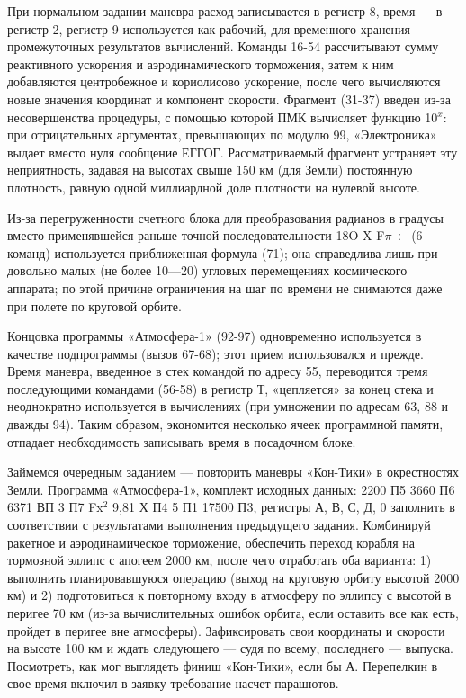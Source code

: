 \documentclass[11pt,a4paper,oneside]{article}
\begin{document}
При нормальном задании маневра расход записывается в регистр 8, время — в регистр 2, регистр 9 используется как рабочий, для временного хранения промежуточных результатов вычислений. Команды 16-54 рассчитывают сумму реактивного ускорения и аэродинамического торможения, затем к ним добавляются центробежное и кориолисово ускорение, после чего вычисляются новые значения координат и компонент скорости. Фрагмент (31-37) введен из-за несовершенства процедуры, с помощью которой ПМК вычисляет функцию 10$^{x}$: при отрицательных аргументах, превышающих по модулю 99, «Электроника» выдает вместо нуля сообщение ЕГГОГ. Рассматриваемый фрагмент устраняет эту неприятность, задавая на высотах свыше 150 км (для Земли) постоянную плотность, равную одной миллиардной доле плотности на нулевой высоте.

Из-за перегруженности счетного блока для преобразования радианов в градусы вместо применявшейся раньше точной последовательности 18O X F$\pi\div$ (6 команд) используется приближенная формула (71); она справедлива лишь при довольно малых (не более 10—20\degree) угловых перемещениях космического аппарата; по этой причине ограничения на шаг по времени не снимаются даже при полете по круговой орбите.

Концовка программы «Атмосфера-1» (92-97) одновременно используется в качестве подпрограммы (вызов 67-68); этот прием использовался и прежде. Время маневра, введенное в стек командой по адресу 55, переводится тремя последующими командами (56-58) в регистр Т, «цепляется» за конец стека и неоднократно используется в вычислениях (при умножении по адресам 63, 88 и дважды 94). Таким образом, экономится несколько ячеек программной памяти, отпадает необходимость записывать время в посадочном блоке.

Займемся очередным заданием — повторить маневры «Кон-Тики» в окрестностях Земли. Программа «Атмосфера-1», комплект исходных данных: 2200 П5 3660 П6 6371 ВП 3 П7 Fx$^{2}$ 9,81 Х П4 5 П1 17500 П3, регистры А, В, С, Д, 0 заполнить в соответствии с результатами выполнения предыдущего задания. Комбинируй ракетное и аэродинамическое торможение, обеспечить переход корабля на тормозной эллипс с апогеем 2000 км, после чего отработать оба варианта: 1) выполнить планировавшуюся операцию (выход на круговую орбиту высотой 2000 км) и 2) подготовиться к повторному входу в атмосферу по эллипсу с высотой в перигее 70 км (из-за вычислительных ошибок орбита, если оставить все как есть, пройдет в перигее вне атмосферы). Зафиксировать свои координаты и скорости на высоте 100 км и ждать следующего — судя по всему, последнего — выпуска. Посмотреть, как мог выглядеть финиш «Кон-Тики», если бы А. Перепелкин в свое время включил в заявку требование насчет парашютов.
\end{document}
